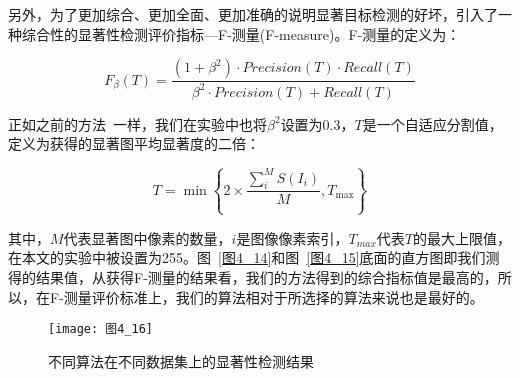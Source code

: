 另外，为了更加综合、更加全面、更加准确的说明显著目标检测的好坏，引入了一种综合性的显著性检测评价指标---F-测量(F-measure)。F-测量的定义为：
\begin{linenomath}
\begin{equation}
F_{\beta}(T)=\frac{(1+\beta^{2})\cdot Precision(T)\cdot Recall(T)}{\beta^{2}\cdot Precision(T)+Recall(T)}
\label{式4_29}
\end{equation}
\end{linenomath}
正如之前的方法~\cite{AchantaCVPR2009Frequency,YanQiongCVPR2013Hierarchical,ShenXiaohuiCVPR2012unified}一样，我们在实验中也将$\beta^{2}$设置为0.3，$T$是一个自适应分割值，定义为获得的显著图平均显著度的二倍：
\begin{linenomath}
\begin{equation}
T=\min\left\{2\times \frac{\sum^{M}_{i}S(I_{i})}{M},T_{\max}\right\}
\label{式4_30}
\end{equation}
\end{linenomath}
其中，$M$代表显著图中像素的数量，$i$是图像像素索引，$T_{max}$代表$T$的最大上限值，在本文的实验中被设置为255。图~\ref{图4_14}和图~\ref{图4_15}底面的直方图即我们测得的结果值，从获得F-测量的结果看，我们的方法得到的综合指标值是最高的，所以，在F-测量评价标准上，我们的算法相对于所选择的算法来说也是最好的。
\begin{figure}[h]
  \centering
  \texttt{[image: 图4\_16]}
  \caption{不同算法在不同数据集上的显著性检测结果}   
  \label{图4_16} 
\end{figure}


